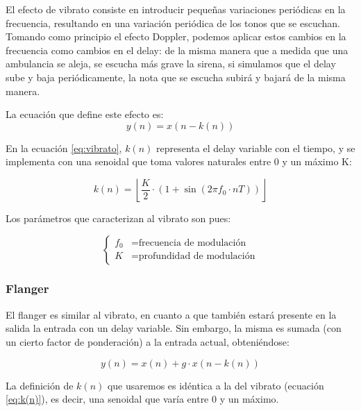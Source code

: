 \documentclass[assd_tp2_main.tex]{subfiles}
\begin{document}
El efecto de vibrato consiste en introducir peque\~nas variaciones peri\'odicas en la frecuencia, resultando en una variaci\'on peri\'odica de los tonos que se escuchan. Tomando como principio el efecto Doppler, podemos aplicar estos cambios en la frecuencia como cambios en el delay: de la misma manera que a medida que una ambulancia se aleja, se escucha m\'as grave  la sirena, si simulamos que el delay sube y baja peri\'odicamente, la nota que se escucha subir\'a y bajar\'a de la misma manera.

La ecuaci\'on que define este efecto es:
\begin{equation}
	y(n) = x\left(n - k(n) \right)
	\label{eq:vibrato}
\end{equation}

En la ecuaci\'on \ref{eq:vibrato}, $k(n)$ representa el delay variable con el tiempo, y se implementa con una senoidal que toma valores naturales entre 0 y un m\'aximo K:

\begin{equation}
	k(n) = \left \lfloor \frac{K}{2} \cdot 
		\left( 1 + \sin{\left(2\pi f_0 \cdot nT\right)} \right) \right \rfloor
		\label{eq:k(n)}
\end{equation}

Los par\'ametros que caracterizan al vibrato son pues:

\begin{equation}
	\left\{
	\begin{aligned}
		f_0	&= \text{frecuencia de modulaci\'on} \\
		K   	&= \text{profundidad de modulaci\'on}
	\end{aligned}	
	\right.
\end{equation}





\subsubsection{Flanger}

El flanger es similar al vibrato, en cuanto a que tambi\'en estar\'a presente en la salida la entrada con un delay variable. Sin embargo, la misma es sumada (con un cierto factor de ponderaci\'on) a la entrada actual, obteni\'endose:

\begin{equation}
	y(n) = x(n) + g\cdot x(n-k(n))
\end{equation}

La definici\'on de $k(n)$ que usaremos es id\'entica a la del vibrato (ecuaci\'on \ref{eq:k(n)}), es decir, una senoidal que var\'ia entre 0 y un m\'aximo. 
\end{document}
